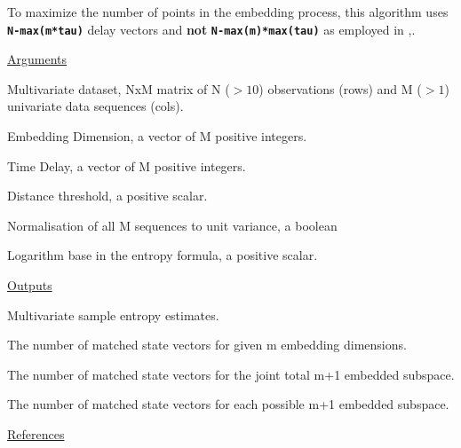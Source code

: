 \documentclass[12pt, a4paper, titlepage, openany]{book}
\begin{document}
\begin{tcolorbox}[colback=ehone!5, colframe=ehtwo!, title=\hypertarget{bidinote}{\textbf{NOTE}}, label={BiBox}]
To maximize the number of points in the embedding process, this algorithm uses \texttt{\textbf{N-max(m*tau)}} delay vectors and \textbf{not} \texttt{\textbf{N-max(m)*max(tau)}} as employed in \cite{MvSamp2},\cite{MvSamp1}.
\end{tcolorbox}

\noindent \ul{Arguments}
\begin{description}[labelsep=1cm, labelwidth=2cm, nosep,,style=multiline,leftmargin=3cm]\footnotesize
\item[\texttt{Data}]	Multivariate dataset, NxM matrix of N ($>10$) observations (rows) and M ($> 1$) univariate data sequences (cols).
\item[\texttt{m}]		Embedding Dimension, a vector of M positive integers.
\item[\texttt{tau}]		Time Delay, a vector of M positive integers.
\item[\texttt{r}]		Distance threshold, a positive scalar.
\item[\texttt{Norm}]	Normalisation of all M sequences to unit variance, a boolean
\item[\texttt{Logx}]	Logarithm base in the entropy formula, a positive scalar.
\end{description}

\noindent \ul{Outputs}
\begin{description}[labelsep=1cm, labelwidth=2cm, nosep, style=multiline,leftmargin=3cm]\footnotesize
\item[\texttt{MSamp}]		Multivariate sample entropy estimates.
\item[\texttt{B0}]		The number of matched state vectors for given m embedding dimensions.
\item[\texttt{Bt}]		 The number of matched state vectors for the joint total m+1 embedded subspace.
\item[\texttt{B1}]		The number of matched state vectors for each possible m+1 embedded subspace.
\end{description}          

\noindent \ul{References}\hspace{1cm}
\cite{MvSamp1}  \cite{MvSamp2}


\newpage
\end{document}
